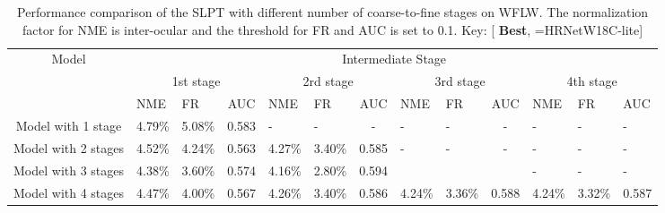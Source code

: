 \documentclass[10pt,twocolumn,letterpaper]{article}
\begin{document}
\begin{table*}[t!]
	\centering
	\begin{tabular}{c|m{0.7cm}<{\centering}m{0.7cm}<{\centering}m{0.7cm}<{\centering}m{0.7cm}<{\centering}m{0.7cm}<{\centering}m{0.7cm}<{\centering}m{0.7cm}<{\centering}m{0.7cm}<{\centering}m{0.7cm}<{\centering}m{0.7cm}<{\centering}m{0.7cm}<{\centering}m{0.7cm}<{\centering}}
		\hline
		\multicolumn{1}{c|}{\multirow{3}{*}{Model}} & \multicolumn{12}{c}{Intermediate Stage}                                                                                                          \\ \cline{2-13} 
		\multicolumn{1}{c|}{} & \multicolumn{3}{c|}{1st stage} & \multicolumn{3}{c|}{2rd stage} & \multicolumn{3}{c|}{3rd stage} & \multicolumn{3}{c}{4th stage} \\ \cline{2-13} 
		\multicolumn{1}{c|}{} & NME & FR & \multicolumn{1}{c|}{AUC} & NME & FR & \multicolumn{1}{c|}{AUC} & NME & FR & \multicolumn{1}{c|}{AUC} & NME & FR & AUC \\ \hline
		Model with 1 stage  &  4.79\%  &  5.08\%  & \multicolumn{1}{c|}{0.583}  & - &  - & \multicolumn{1}{c|}{-} & - & - & \multicolumn{1}{c|}{-}    & - &  -   &  - \\ \hline
		Model with 2 stages & 4.52\% & 4.24\% & \multicolumn{1}{c|}{0.563} & 4.27\% & 3.40\% & \multicolumn{1}{c|}{0.585} & - & - & \multicolumn{1}{c|}{-}    & -  &  - & -  \\ \hline
		Model with 3 stages  & 4.38\% & 3.60\%& \multicolumn{1}{c|}{0.574} & 4.16\%  & 2.80\%  & \multicolumn{1}{c|}{0.594} & {\color{red} } & {\color{red} } & \multicolumn{1}{c|}{{\color{red} }}    &  -  & -  &  - \\ \hline
		Model with 4 stages & 4.47\% & 4.00\%  & \multicolumn{1}{c|}{0.567} & 4.26\% & 3.40\% & \multicolumn{1}{c|}{0.586} &4.24\% & 3.36\%  & \multicolumn{1}{c|}{0.588}    &  4.24\%  &  3.32\% & 0.587 \\ \hline
	\end{tabular}
	\caption{Performance comparison of the SLPT with different number of coarse-to-fine stages on WFLW. The normalization factor for NME is inter-ocular and the threshold for FR and AUC is set to 0.1. Key: [{\color{red} \textbf{Best}}, =HRNetW18C-lite]}
	\label{Tabel5}
\end{table*}
\end{document}
